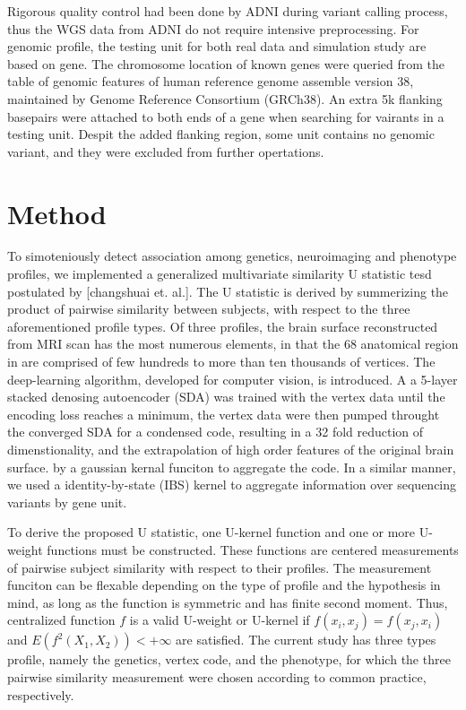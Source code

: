 \documentclass[twocolumn]{article}
\begin{document}
Rigorous quality control had been done by ADNI during variant calling process, thus the WGS data from ADNI do not require intensive preprocessing. For genomic profile, the testing unit for both real data and simulation study are based on gene. The chromosome location of known genes were queried from the table of genomic features of human reference genome assemble version 38, maintained by Genome Reference Consortium (GRCh38). An extra 5k flanking basepairs were attached to both ends of a gene when searching for vairants in a testing unit. Despit the added flanking region, some unit contains no genomic variant, and they were excluded from further opertations.

\section{Method}

To simoteniously detect association among genetics, neuroimaging and phenotype profiles, we implemented a generalized multivariate similarity U statistic tesd postulated by [changshuai et. al.]. The U statistic is derived by summerizing the product of pairwise similarity between subjects, with respect to the three aforementioned profile types. Of three profiles, the brain surface reconstructed from MRI scan has the most numerous elements, in that the 68 anatomical region in are comprised of few hundreds to more than ten thousands of vertices. The deep-learning algorithm, developed for computer vision, is introduced. A a 5-layer stacked denosing autoencoder (SDA) was trained with the vertex data until the encoding loss reaches a minimum, the vertex data were then pumped throught the converged SDA for a condensed code, resulting in a 32 fold reduction of dimenstionality, and the extrapolation of high order features of the original brain surface.  by a gaussian kernal funciton to aggregate the code. In a similar manner, we used a identity-by-state (IBS) kernel to aggregate information over sequencing variants by gene unit. 

  To derive the proposed U statistic, one U-kernel function and one or more U-weight functions must be constructed. These functions are centered measurements of pairwise subject similarity with respect to their profiles. The measurement funciton can be flexable depending on the type of profile and the hypothesis in mind, as long as the function is symmetric and has finite second moment. Thus, centralized function $f$ is a valid U-weight or U-kernel if $f(x_i,x_j)=f(x_j,x_i)$ and $E(f^2(X_1, X_2))<+\infty$ are satisfied. The current study has three types profile, namely the genetics, vertex code, and the phenotype, for which the three pairwise similarity measurement were chosen according to common practice, respectively.
\end{document}
